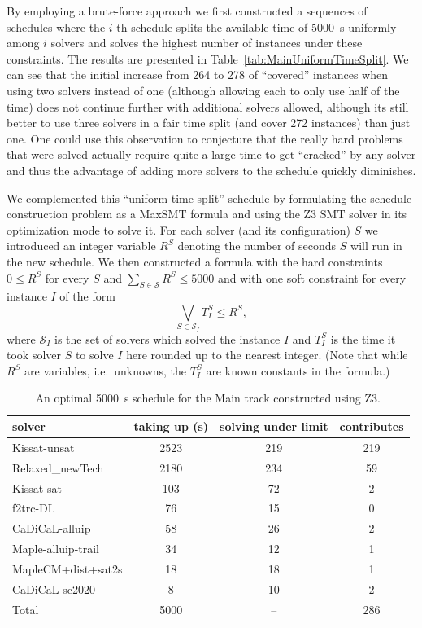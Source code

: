 \documentclass{elsarticle}
\begin{document}
By employing a brute-force approach we first constructed a sequences of schedules 
where the $i$-th schedule splits the available time of \SI{5000}{\second} uniformly among
$i$ solvers and solves the highest number of instances under these constraints.
The results are presented in Table~\ref{tab:MainUniformTimeSplit}.
We can see that the initial increase from 264 to 278 of ``covered'' instances 
when using two solvers instead of one (although allowing each to only use half of the time)
does not continue further with additional solvers allowed,
although its still better to use three solvers in a fair time split 
(and cover 272 instances) than just one.
One could use this observation to conjecture that the really hard 
problems that were solved actually require quite a large time to 
get ``cracked'' by any solver and thus the advantage of adding more solvers to the schedule
quickly diminishes.

We complemented this ``uniform time split'' schedule by formulating the schedule construction
problem as a MaxSMT formula and using the Z3 SMT solver \cite{DBLP:conf/tacas/MouraB08} in its optimization mode \cite{DBLP:conf/sycss/BjornerP14} to solve it.
For each solver (and its configuration) $S$ we introduced an integer variable $R^S$ denoting 
the number of seconds $S$ will run in the new schedule. We then constructed a formula with the hard
constraints $0 \leq R^S$ for every $S$ and $\sum_{S\in\mathcal{S}} R^S \leq 5000$ and with one 
soft constraint for every instance $I$ of the form
\[\bigvee_{S \in \mathcal{S}_I} T^S_I \leq R^S,\]
where $\mathcal{S}_I$ is the set of solvers which solved the instance $I$ and $T^S_I$ is the time it took solver $S$ to solve $I$ here rounded up to the nearest integer.
(Note that while $R^S$ are variables, i.e.~unknowns, the $T^S_I$ are known constants in the formula.)

\begin{table}
\caption{An optimal \SI{5000}{\second} schedule for the Main track
constructed using Z3.}
\label{tab:MainZ3Schedule}
\begin{center}
\begin{tabular}{lccc}
solver & taking up (s) & solving under limit & contributes \\
\hline
Kissat-unsat & 2523 & 219 & 219 \\
Relaxed\_newTech & 2180 & 234 & \phantom{0}59 \\
Kissat-sat & \phantom{0}103 & \phantom{0}72 & \phantom{00}2 \\
f2trc-DL & \phantom{00}76 & \phantom{0}15 & \phantom{00}0 \\
CaDiCaL-alluip & \phantom{00}58 & \phantom{0}26 & \phantom{00}2 \\
Maple-alluip-trail & \phantom{00}34 & \phantom{0}12 & \phantom{00}1 \\
MapleCM+dist+sat2s & \phantom{00}18 & \phantom{0}18 & \phantom{00}1 \\
CaDiCaL-sc2020 & \phantom{000}8 & \phantom{0}10 & \phantom{00}2 \\
\hline 
Total & 5000 & \phantom{0}-- & 286 \\ 
\end{tabular}
\end{center}
\end{table}
\end{document}
